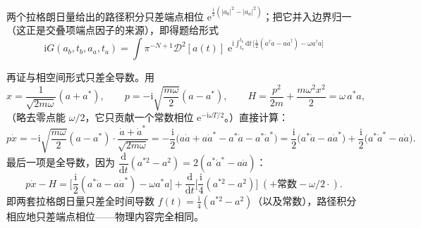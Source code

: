 两个拉格朗日量给出的路径积分只差端点相位 $\mathrm{e}^{\frac{\mathrm{i}}{2}(|a_b|^2-|a_a|^2)}$；把它并入边界归一（这正是交叠项端点因子的来源），即得题给形式
\begin{equation*}
\boxed{\;\mathrm{i}G(a_b,t_b,a_a,t_a)=\int\pi^{-N+1}\mathcal D^2[a(t)]\;
\mathrm{e}^{\mathrm{i}\int_{t_a}^{t_b}\mathrm{d}t\,\big[\frac{\mathrm{i}}{2}(a^\dagger\dot a-a\dot a^\dagger)-\omega a^\dagger a\big]}\;}
\end{equation*}

再证与相空间形式只差全导数。用
\begin{equation*}
x=\frac{1}{\sqrt{2m\omega}}(a+a^*),\qquad
p=-\mathrm{i}\sqrt{\frac{m\omega}{2}}(a-a^*),
\qquad H=\frac{p^2}{2m}+\frac{m\omega^2x^2}{2}=\omega\,a^*a,
\end{equation*}
（略去零点能 $\omega/2$，它只贡献一个常数相位 $\mathrm{e}^{-\mathrm{i}\omega T/2}$。）直接计算：
\begin{equation*}
p\dot x=-\mathrm{i}\sqrt{\frac{m\omega}{2}}(a-a^*)\cdot\frac{\dot a+\dot a^*}{\sqrt{2m\omega}}
=-\frac{\mathrm{i}}{2}\big(a\dot a+a\dot a^*-a^*\dot a-a^*\dot a^*\big)
=\frac{\mathrm{i}}{2}\big(a^*\dot a-a\dot a^*\big)+\frac{\mathrm{i}}{2}\big(a^*\dot a^*-a\dot a\big).
\end{equation*}
最后一项是全导数，因为 $\dfrac{\mathrm{d}}{\mathrm{d}t}(a^{*2}-a^2)=2(a^*\dot a^*-a\dot a)$：
\begin{equation*}
p\dot x-H=\Big[\frac{\mathrm{i}}{2}(a^*\dot a-a\dot a^*)-\omega a^*a\Big]
+\frac{\mathrm{d}}{\mathrm{d}t}\Big[\frac{\mathrm{i}}{4}(a^{*2}-a^2)\Big]
\;(+\text{常数}-\omega/2\cdot).
\end{equation*}
即两套拉格朗日量只差全时间导数 $f(t)=\frac{\mathrm{i}}{4}(a^{*2}-a^2)$（以及常数），路径积分相应地只差端点相位——物理内容完全相同。

